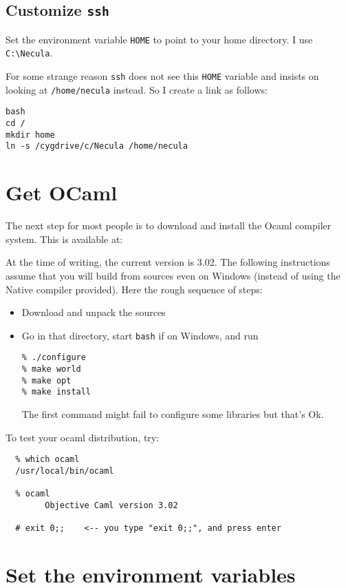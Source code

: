 \documentclass{article}
\def\t#1{{\tt #1}}
\begin{document}
 \subsection{Customize \t{ssh}}\label{sec-win-ssh}

 Set the environment variable \t{HOME} to point to your home directory. I use
 \t{C:\backslash Necula}. 

 For some strange reason \t{ssh} does not see this \t{HOME} variable and
insists on looking at \t{/home/necula} instead. So I create a link as follows:
\begin{verbatim}
bash
cd /
mkdir home
ln -s /cygdrive/c/Necula /home/necula
\end{verbatim}

\section{Get OCaml}\label{sec-ocaml}

The next step for most people is to download and install the Ocaml
compiler system.  This is available at:


At the time of writing, the current version is 3.02. The following
instructions assume that you will build from sources even on Windows (instead
of using the Native compiler provided). Here the rough sequence of steps:
\begin{itemize}
\item Download and unpack the sources
\item Go in that directory, start \t{bash} if on Windows, and run
\begin{verbatim}
% ./configure
% make world
% make opt
% make install
\end{verbatim}

 The first command might fail to configure some libraries but that's Ok. 
\end{itemize}

To test your ocaml distribution, try:

\begin{verbatim}
  % which ocaml
  /usr/local/bin/ocaml

  % ocaml
        Objective Caml version 3.02

  # exit 0;;    <-- you type "exit 0;;", and press enter
\end{verbatim}


\section{Set the environment variables}
\end{document}
